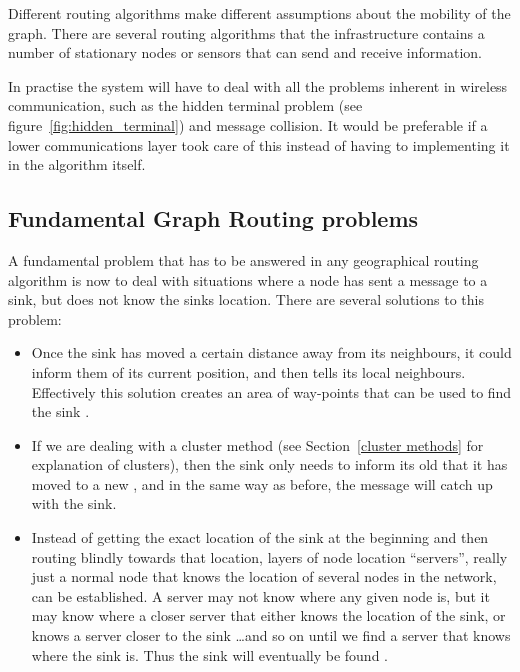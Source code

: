 Different routing algorithms make different assumptions about the mobility of the graph. There are several routing algorithms \cite{adaptive, two-tier} that the infrastructure contains a number of stationary nodes or sensors that can send and receive information. 


In practise the system will have to deal with all the problems inherent in wireless communication, such as the hidden terminal problem (see figure~\ref{fig:hidden_terminal}) and message collision. It would be preferable if a lower communications layer took care of this instead of having to implementing it in the algorithm itself.

\subsection{Fundamental Graph Routing problems}

A fundamental problem that has to be answered in any geographical routing algorithm is now to deal with situations where a node has sent a message to a sink, but does not know the sinks location. There are several solutions to this problem:

\begin{itemize}
\item Once the sink has moved a certain distance away from its neighbours, it could inform them of its current position, and then tells its local neighbours. Effectively this solution creates an area of way-points that can be used to find the sink \cite{adaptive}.
\item If we are dealing with a cluster method (see Section~\ref{cluster methods} for explanation of clusters), then the sink only needs to inform its old \ch that it has moved to a new \ch, and in the same way as before, the message will catch up with the sink.
\item Instead of getting the exact location of the sink at the beginning and then routing blindly towards that location, layers of node location ``servers'', really just a normal node that knows the location of several nodes in the network, can be established. A server may not know where any given node is, but it may know where a closer server that either knows the location of the sink, or knows a server closer to the sink \ldots and so on until we find a server that knows where the sink is. Thus the sink will eventually be found \cite{scaleLocation}.
\end{itemize}

